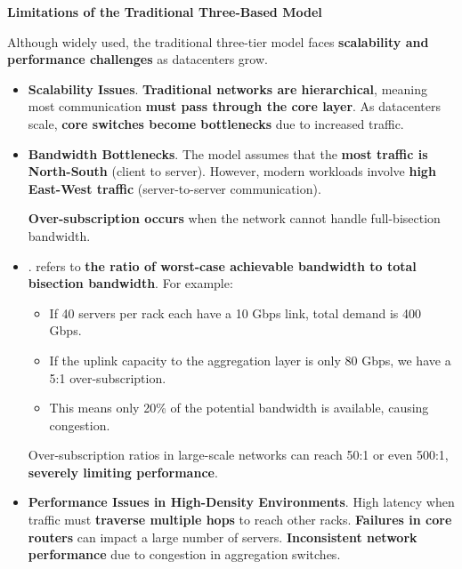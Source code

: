 \highspace
\begin{flushleft}
    \textcolor{Red2}{ \textbf{Limitations of the Traditional Three-Based Model}}
\end{flushleft}
Although widely used, the traditional three-tier model faces \textbf{scalability and performance challenges} as datacenters grow.
\begin{itemize}
    \item \textcolor{Red2}{\textbf{Scalability Issues}}. \textbf{Traditional networks are hierarchical}, meaning most communication \textbf{must pass through the core layer}. As datacenters scale, \textbf{core switches become bottlenecks} due to increased traffic.

    \item \textcolor{Red2}{\textbf{Bandwidth Bottlenecks}}. The model assumes that the \textbf{most traffic is North-South} (client to server). However, modern workloads involve \textbf{high East-West traffic} (server-to-server communication).
    
    \textbf{Over-subscription occurs} when the network cannot handle full-bisection bandwidth.

    \item {}.  refers to \textbf{the ratio of worst-case achievable bandwidth to total bisection bandwidth}. For example:
    \begin{itemize}
        \item If 40 servers per rack each have a 10 Gbps link, total demand is 400 Gbps.
        \item If the uplink capacity to the aggregation layer is only 80 Gbps, we have a 5:1 over-subscription.
        \item This means only 20\% of the potential bandwidth is available, causing congestion.
    \end{itemize}
    Over-subscription ratios in large-scale networks can reach 50:1 or even 500:1, \textbf{severely limiting performance}.

    \item \textcolor{Red2}{\textbf{Performance Issues in High-Density Environments}}. High latency when traffic must \textbf{traverse multiple hops} to reach other racks. \textbf{Failures in core routers} can impact a large number of servers. \textbf{Inconsistent network performance} due to congestion in aggregation switches.
\end{itemize}

